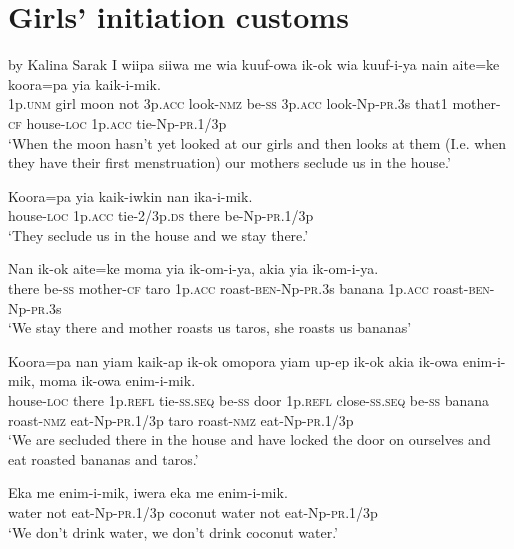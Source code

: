 \section{  Girls’ initiation customs }
 by Kalina Sarak
\ea
\gll  I  wiipa  siiwa  me  wia  kuuf-owa  ik-ok  wia  kuuf-i-ya          nain  aite=ke  koora=pa  yia  kaik-i-mik. \\
1p.\textsc{unm}  girl  moon  not  3p.\textsc{acc}  look-\textsc{nmz}  be-\textsc{ss}  3p.\textsc{acc}  look-Np-\textsc{pr}.3s  that1  mother-\textsc{cf}  house-\textsc{loc}  1p.\textsc{acc}  tie-Np-\textsc{pr}.1/3p \\


\glt ‘When the moon hasn’t yet looked at our girls and then looks at them (I.e. when they have their first menstruation) our mothers seclude us in the house.’ \\
\z


\ea
\gll  Koora=pa  yia  kaik-iwkin  nan  ika-i-mik. \\
house-\textsc{loc}  1p.\textsc{acc}  tie-2/3p.\textsc{ds}  there  be-Np-\textsc{pr}.1/3p \\
\glt ‘They seclude us in the house and we stay there.’ \\
\z


\ea
\gll  Nan  ik-ok  aite=ke  moma  yia  ik-om-i-ya,          akia  yia  ik-om-i-ya. \\
there  be-\textsc{ss}  mother-\textsc{cf}  taro  1p.\textsc{acc}  roast-\textsc{ben}-Np-\textsc{pr}.3s  banana  1p.\textsc{acc}  roast-\textsc{ben}-Np-\textsc{pr}.3s \\


\glt ‘We stay there and mother roasts us taros, she roasts us bananas’ \\
\z


\ea
\gll  Koora=pa  nan  yiam  kaik-ap  ik-ok  omopora  yiam  up-ep           ik-ok  akia  ik-owa  enim-i-mik,  moma  ik-owa  enim-i-mik. \\
house-\textsc{loc}  there  1p.\textsc{refl}  tie-\textsc{ss.seq}  be-\textsc{ss}  door  1p.\textsc{refl}  close-\textsc{ss.seq} be-\textsc{ss}  banana  roast-\textsc{nmz}  eat-Np-\textsc{pr}.1/3p  taro  roast-\textsc{nmz}  eat-Np-\textsc{pr}.1/3p \\


\glt ‘We are secluded there in the house and have locked the door on ourselves and eat roasted bananas and taros.’ \\
\z


\ea
\gll  Eka  me  enim-i-mik,  iwera  eka  me  enim-i-mik. \\
water  not  eat-Np-\textsc{pr}.1/3p  coconut  water  not  eat-Np-\textsc{pr}.1/3p \\
\glt ‘We don’t drink water, we don’t drink coconut water.’ \\
\z



